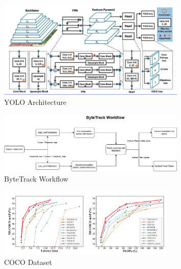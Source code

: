 \documentclass[11pt]{article}
\begin{document}
\newpage
\begin{figure}[h]
    \centering
    \includegraphics[width=0.8\textwidth]{figs/yolo-arch.png}
    \caption{YOLO Architecture}
    \label{fig:yolo_architecture}
\end{figure}
\begin{figure}[h]
    \centering
    \includegraphics[width=0.8\textwidth]{figs/bytetrack-workflow.png}
    \caption{ByteTrack Workflow}
    \label{fig:byetrack_workflow}
\end{figure}
\begin{figure}[h]
    \centering
    \includegraphics[width=0.75\textwidth]{figs/coco.png}
    \caption{COCO Dataset}
    \label{fig:coco_dataset}
\end{figure}
\newpage
\end{document}
